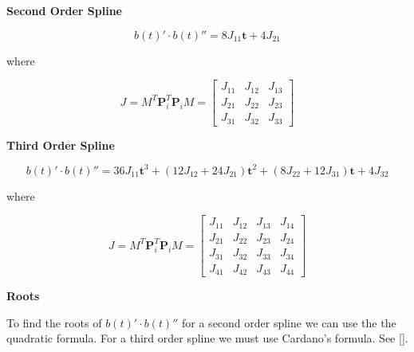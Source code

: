 \documentclass{article}
\begin{document}
\hspace{1cm}

\textbf{Second Order Spline}

\hspace{1cm}

\begin{equation}
    b(t)' \cdot b(t)'' = 8J_{11}\textbf{t} + 4J_{21}
\end{equation}

where

\begin{equation}
    J = M^{T}\textbf{P}_i^{T}\textbf{P}_iM = \begin{bmatrix} J_{11} & J_{12} & J_{13} \\
                        J_{21} & J_{22} & J_{23} \\
                        J_{31} & J_{32} & J_{33} \end{bmatrix}
\end{equation}  

\hspace{1cm}

\textbf{Third Order Spline}

\hspace{1cm}

\begin{equation}
     b(t)' \cdot b(t)'' =  36J_{11}\textbf{t}^3 + (12J_{12} + 24J_{21})\textbf{t}^2 + (8J_{22} + 12J_{31})\textbf{t} + 4J_{32}
\end{equation}

where

\begin{equation}
    J = M^{T}\textbf{P}_i^{T}\textbf{P}_iM = \begin{bmatrix} J_{11} & J_{12} & J_{13} & J_{14} \\
                        J_{21} & J_{22} & J_{23} & J_{24} \\
                        J_{31} & J_{32} & J_{33} & J_{34} \\
                        J_{41} & J_{42} & J_{43} & J_{44}\end{bmatrix}
\end{equation}  

\hspace{1cm}

\textbf{Roots}

\hspace{1cm}

To find the roots of \(b(t)' \cdot b(t)''\) for a second order spline we can use the the quadratic formula. For a third order spline we must use Cardano's formula. See []. 
\end{document}
